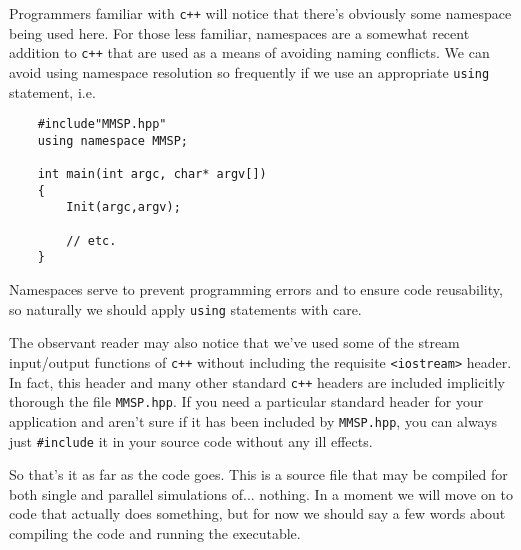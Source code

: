 Programmers familiar with {\tt c++} will notice that there's obviously some \MMSP namespace being used here.  For those less familiar, namespaces are a somewhat recent addition to {\tt c++} that are used as a means of avoiding naming conflicts.  We can avoid using namespace resolution so frequently if we use an appropriate {\tt using} statement, i.e. 
\begin{shadebox}
\begin{verbatim}
    #include"MMSP.hpp"
    using namespace MMSP;

    int main(int argc, char* argv[])
    {
        Init(argc,argv);

        // etc. 
    }
\end{verbatim}
\end{shadebox}
Namespaces serve to prevent programming errors and to ensure code reusability, so naturally we should apply {\tt using} statements with care.

The observant reader may also notice that we've used some of the stream input/output functions of {\tt c++} without including the requisite {\tt <iostream>} header.  In fact, this header and many other standard {\tt c++} headers are included implicitly thorough the file {\tt MMSP.hpp}.  If you need a particular standard header for your application and aren't sure if it has been included by {\tt MMSP.hpp}, you can always just {\tt \#include} it in your source code without any ill effects.

So that's it as far as the code goes.  This is a source file that may be compiled for both single and parallel simulations of... nothing.  In a moment we will move on to code that actually does something, but for now we should say a few words about compiling the code and running the executable.

